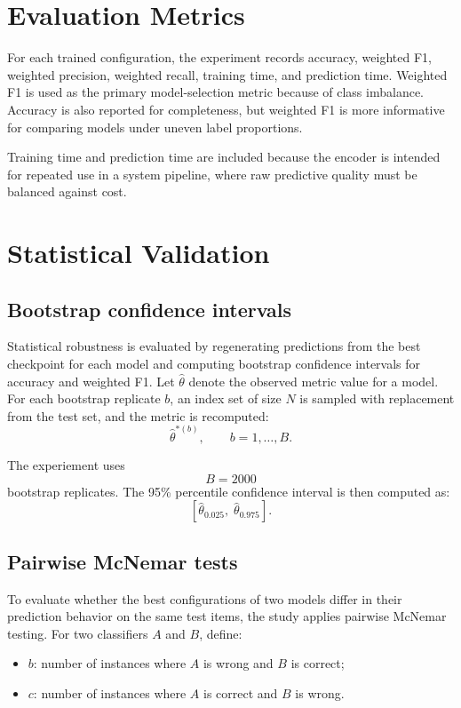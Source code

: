 \documentclass[11pt]{article}
\begin{document}
\section{Evaluation Metrics}

For each trained configuration, the experiment records accuracy, weighted F1, weighted precision, weighted recall, training time, and prediction time. Weighted F1 is used as the primary model-selection metric because of class imbalance. Accuracy is also reported for completeness, but weighted F1 is more informative for comparing models under uneven label proportions.

Training time and prediction time are included because the encoder is intended for repeated use in a system pipeline, where raw predictive quality must be balanced against cost.

\section{Statistical Validation}

\subsection{Bootstrap confidence intervals}

Statistical robustness is evaluated by regenerating predictions from the best checkpoint for each model and computing bootstrap confidence intervals for accuracy and weighted F1. Let $\hat{\theta}$ denote the observed metric value for a model. For each bootstrap replicate $b$, an index set of size $N$ is sampled with replacement from the test set, and the metric is recomputed:
\[
\hat{\theta}^{*(b)}, \qquad b = 1,\dots,B.
\]

The experiement uses
\[
B = 2000
\]
bootstrap replicates. The 95\% percentile confidence interval is then computed as:
\[
\left[\hat{\theta}^{}_{0.025},\; \hat{\theta}^{}_{0.975}\right].
\]

\subsection{Pairwise McNemar tests}

To evaluate whether the best configurations of two models differ in their prediction behavior on the same test items, the study applies pairwise McNemar testing. For two classifiers $A$ and $B$, define:
\begin{itemize}
    \item $b$: number of instances where $A$ is wrong and $B$ is correct;
    \item $c$: number of instances where $A$ is correct and $B$ is wrong.
\end{itemize}
\end{document}
